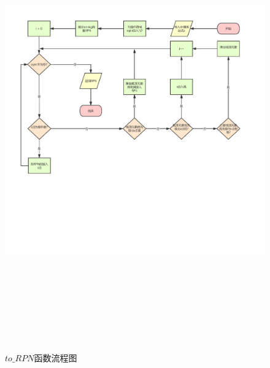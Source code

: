 \documentclass[UTF8]{ctexart}
\begin{document}
\begin{figure}[H]
	\centering 
	\includegraphics[width=20cm, height=19cm]{to_RPN.pdf} 
	\caption{$to\_RPN$函数流程图} 
	\label{to RPN}
\end{figure}
\end{document}
